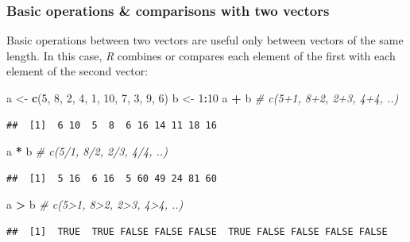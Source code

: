 \documentclass[
]{scrartcl}
\newenvironment{Shaded}{\begin{snugshade}}{\end{snugshade}}
\newcommand{\CommentTok}[1]{\textcolor[rgb]{0.56,0.35,0.01}{\textit{#1}}}
\newcommand{\DecValTok}[1]{\textcolor[rgb]{0.00,0.00,0.81}{#1}}
\newcommand{\FunctionTok}[1]{\textcolor[rgb]{0.13,0.29,0.53}{\textbf{#1}}}
\newcommand{\NormalTok}[1]{#1}
\newcommand{\OtherTok}[1]{\textcolor[rgb]{0.56,0.35,0.01}{#1}}
\newcommand{\SpecialCharTok}[1]{\textcolor[rgb]{0.81,0.36,0.00}{\textbf{#1}}}
\begin{document}
\subsubsection{Basic operations \& comparisons with two vectors}\label{basic-operations-comparisons-with-two-vectors}

Basic operations between two vectors are useful only between vectors of the same length. In this case, \emph{R} combines or compares each element of the first with each element of the second vector:

\begin{Shaded}
\begin{Highlighting}[]
\NormalTok{a }\OtherTok{\textless{}{-}} \FunctionTok{c}\NormalTok{(}\DecValTok{5}\NormalTok{, }\DecValTok{8}\NormalTok{, }\DecValTok{2}\NormalTok{, }\DecValTok{4}\NormalTok{, }\DecValTok{1}\NormalTok{, }\DecValTok{10}\NormalTok{, }\DecValTok{7}\NormalTok{, }\DecValTok{3}\NormalTok{, }\DecValTok{9}\NormalTok{, }\DecValTok{6}\NormalTok{)}
\NormalTok{b }\OtherTok{\textless{}{-}} \DecValTok{1}\SpecialCharTok{:}\DecValTok{10}
\NormalTok{a }\SpecialCharTok{+}\NormalTok{ b    }\CommentTok{\# c(5+1, 8+2, 2+3, 4+4, ..)}
\end{Highlighting}
\end{Shaded}

\begin{verbatim}
##  [1]  6 10  5  8  6 16 14 11 18 16
\end{verbatim}

\begin{Shaded}
\begin{Highlighting}[]
\NormalTok{a }\SpecialCharTok{*}\NormalTok{ b    }\CommentTok{\# c(5/1, 8/2, 2/3, 4/4, ..)}
\end{Highlighting}
\end{Shaded}

\begin{verbatim}
##  [1]  5 16  6 16  5 60 49 24 81 60
\end{verbatim}

\begin{Shaded}
\begin{Highlighting}[]
\NormalTok{a }\SpecialCharTok{\textgreater{}}\NormalTok{ b    }\CommentTok{\# c(5\textgreater{}1, 8\textgreater{}2, 2\textgreater{}3, 4\textgreater{}4, ..)}
\end{Highlighting}
\end{Shaded}

\begin{verbatim}
##  [1]  TRUE  TRUE FALSE FALSE FALSE  TRUE FALSE FALSE FALSE FALSE
\end{verbatim}
\end{document}
